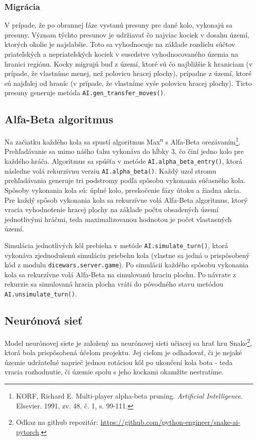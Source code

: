 \documentclass[pdftex, 11pt, a4paper, titlepage]{article}
\newcommand{\code}{\texttt}
\begin{document}
    \subsubsection*{Migrácia}
    V prípade, že po obrannej fáze vystanú presuny pre dané kolo, vykonajú sa  presuny. Význam týchto presunov je udržiavať čo najviac
    kociek v dosahu území, ktorých okolie je najslabšie. Toto sa vyhodnocuje na základe rozdielu súčtov priateľských a nepriateľských kociek v susedstve
    vyhodnocovaného územia na hranici regiónu. Kocky migrujú buď z území, ktoré sú čo najbližšie k hraniciam (v prípade, že vlastníme menej, než polovicu hracej plochy),
    prípadne z území, ktoré sú najďalej od hraníc (v prípade, že vlastníme vyše polovicu hracej plochy). Tieto presuny generuje metóda \code{AI.gen\_transfer\_moves()}.

    \subsection{Alfa-Beta algoritmus}
    Na začiatku každého kola sa spustí algoritmus Max\textsuperscript{n} s Alfa-Beta orezávaním\footnote{KORF, Richard E. Multi-player alpha-beta pruning. \emph{Artificial Intelligence}. Elsevier. 1991, zv. 48, č. 1, s. 99-111.}.
    Prehľadávanie sa mimo nášho ťahu vykonáva do hĺbky 3, čo činí jedno kolo pre každého hráča. Algoritmus sa spúšťa v metóde \code{AI.alpha\_beta\_entry()},
    ktorá následne volá rekurzívnu verziu \code{AI.alpha\_beta()}. Každý uzol stromu prehľadávania generuje tri podstromy podľa spôsobu vykonania súčasného kola.
    Spôsoby vykonania kola sú: úplné kolo, preskočenie fázy útoku a žiadna akcia. Pre každý spôsob vykonania kola sa rekurzívne volá Alfa-Beta algoritmus, ktorý
    vracia vyhodnotenie hracej plochy na základe počtu obsadených území jednotlivými hráčmi, teda maximalizovanou hodnotou je počet vlastnených území.

    Simulácia jednotlivých kôl prebieha v metóde \code{AI.simulate\_turn()}, ktorá vykonáva zjednodušenú simuláciu priebehu kola (vlastne sa jedná o prispôsobený
    kód z modulu \code{dicewars.server.game}). Po simulácii každého spôsobu vykonania kola sa rekurzívne volá Alfa-Beta na simulovanú hraciu plochu.
    Po návrate z rekurzie sa simulovaná hracia plocha vráti do pôvodného stavu metódou \code{AI.unsimulate\_turn()}.

    \subsection{Neurónová sieť}\label{sec:nn}
    Model neurónovej siete je založený na neurónovej sieti učiacej sa hrať hru Snake\footnote{Odkaz na github repozitár: \href{https://github.com/python-engineer/snake-ai-pytorch}{https://github.com/python-engineer/snake-ai-pytorch}.},
    ktorá bola prispôsobená účelom projektu. Jej cieľom je odhadovať, či je nejaké územie udržateľné naprieč jednou rotáciou kôl po ukončení kola bota -
    teda vracia rozhodnutie, či územie spolu s jeho kockami okamžite nestratíme.
\end{document}
